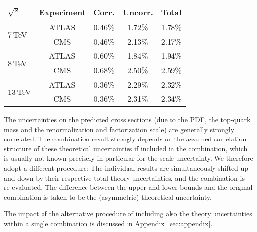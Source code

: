 \begin{enumerate}
    \newcommand{\tableWidthLumi}{2.5cm}
    \begin{table*}[ht]
    \centering
    \label{tab:lumitable}
    \begin{tabular}{l c c c c}
    $\sqrt{s}$                & Experiment & Corr.  & Uncorr. & Total \\
    \midrule
    \multirow{2}{*}{7\,TeV}   &  ATLAS     &  0.46\%  &  1.72\%  &  1.78\% \\
                              &  CMS       &  0.46\%  &  2.13\%  &  2.17\% \\[7pt]
    \multirow{2}{*}{8\,TeV}   &  ATLAS     &  0.60\%  &  1.84\%  &  1.94\% \\
                              &  CMS       &  0.68\%  &  2.50\%  &  2.59\% \\[7pt]
    \multirow{2}{*}{13\,TeV}  &  ATLAS     &  0.36\%  &  2.29\%  &  2.32\% \\
                              &  CMS       &  0.36\%  &  2.31\%  &  2.34\% \\
    \end{tabular} 
    \end{table*} 

\end{enumerate}

The uncertainties on the predicted cross sections (due to the PDF, the
top-quark mass and the renormalization and factorization scale) 
are generally strongly correlated. 
%
The combination result strongly depends on the assumed correlation
structure of these theoretical uncertainties if included in the
combination, which is usually not known precisely in particular for
the scale uncertainty.
%
We therefore adopt
a different procedure: The individual results are
simultaneously shifted up and down by their respective total theory uncertainties, and the
combination is re-evaluated.
% 
The difference between the upper and
lower bounds and the original combination is taken to be the
(asymmetric) theoretical uncertainty.

The impact of the alternative procedure of including also the theory
uncertainties within a single combination is discussed in
Appendix~\ref{sec:appendix}.

